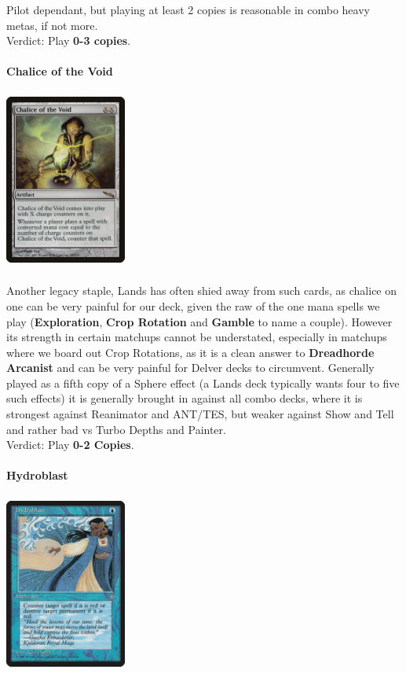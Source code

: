 \documentclass{report}
\begin{document}
Pilot dependant, but playing at least 2 copies is reasonable in combo heavy metas, if not more.\\
Verdict: Play \textbf{0-3 copies}.\\\\
\newpage
\textbf{Chalice of the Void}
\begin{center}
\includegraphics [width = 4cm, height = 6cm] {chalice-of-the-void}
\end{center}
Another legacy staple, Lands has often shied away from such cards, as chalice on one can be very painful for our deck, given the raw of the one mana spells we play (\textbf{Exploration}, \textbf{Crop Rotation} and \textbf{Gamble} to name a couple). However its strength in certain matchups cannot be understated, especially in matchups where we board out Crop Rotations, as it is a clean answer to \textbf{Dreadhorde Arcanist} and can be very painful for Delver decks to circumvent. Generally played as a fifth copy of a Sphere effect (a Lands deck typically wants four to five such effects) it is generally brought in against all combo decks, where it is strongest against Reanimator and ANT/TES, but weaker against Show and Tell and rather bad vs Turbo Depths and Painter.\\
Verdict: Play \textbf{0-2 Copies}.\\\\
\textbf{Hydroblast}
\begin{center}
\includegraphics [width = 4cm, height = 6cm] {hydroblast}
\end{center}
\end{document}
